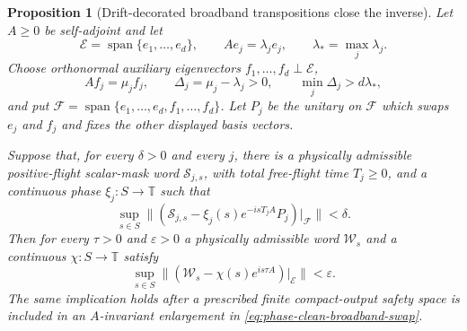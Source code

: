 \documentclass[11pt]{article}
\newtheorem{proposition}[theorem]{Proposition}
\theoremstyle{remark}
\newcommand{\T}{\mathbb T}
\begin{document}
\begin{proposition}[Drift-decorated broadband transpositions close the inverse]
\label{prop:broadband-transposition-criterion}
Let $A\geq0$ be self-adjoint and let
\[
 \mathcal E=\operatorname{span}\{e_1,\ldots,e_d\},
 \qquad
 Ae_j=\lambda_je_j,
 \qquad
 \lambda_\ast=\max_j\lambda_j.
\]
Choose orthonormal auxiliary eigenvectors $f_1,\ldots,f_d\perp\mathcal E$,
\begin{equation}
 Af_j=\mu_jf_j,
 \qquad
 \Delta_j=\mu_j-\lambda_j>0,
 \qquad
 \min_j\Delta_j>d\lambda_\ast,
 \label{eq:high-auxiliary-gap}
\end{equation}
and put
$\mathcal F=\operatorname{span}\{e_1,\ldots,e_d,f_1,\ldots,f_d\}$.
Let $P_j$ be the unitary on $\mathcal F$ which swaps $e_j$ and $f_j$ and fixes
the other displayed basis vectors.

Suppose that, for every $\delta>0$ and every $j$, there is a physically
admissible positive-flight scalar-mask word $\mathcal S_{j,s}$, with total
free-flight time $T_j\geq0$, and a continuous phase $\xi_j:S\to\T$ such that
\begin{equation}
 \sup_{s\in S}
 \|(\mathcal S_{j,s}
      -\xi_j(s)e^{-isT_jA}P_j)|_{\mathcal F}\|<\delta.
 \label{eq:phase-clean-broadband-swap}
\end{equation}
Then for every $\tau>0$ and $\varepsilon>0$ a physically admissible word
$\mathcal W_s$ and a continuous $\chi:S\to\T$ satisfy
\begin{equation}
 \sup_{s\in S}
 \|(\mathcal W_s-\chi(s)e^{is\tau A})|_{\mathcal E}\|<\varepsilon.
 \label{eq:swap-synthesized-inverse}
\end{equation}
The same implication holds after a prescribed finite compact-output safety
space is included in an $A$-invariant enlargement in
\eqref{eq:phase-clean-broadband-swap}.
\end{proposition}
\end{document}
